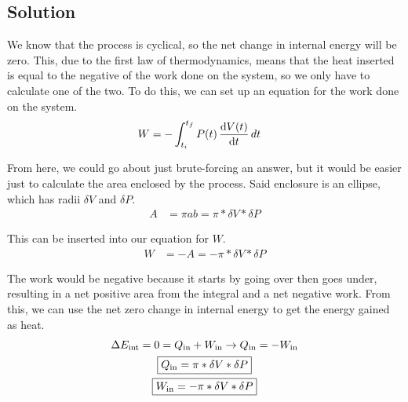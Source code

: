 \documentclass[12pt]{article}
\begin{document}
        \subsection{Solution}
            We know that the process is cyclical, so the net change in internal energy will be zero. 
            This, due to the first law of thermodynamics, means that the heat inserted is equal to the negative of the work done on the system, so we only have to calculate one of the two.
            To do this, we can set up an equation for the work done on the system.
            \begin{align}
                W   &=  -\int_{t_i}^{t_f} P(t)\,\dv{V(t)}{t}\,dt
            \end{align}

            From here, we could go about just brute-forcing an answer, but it would be easier just to calculate the area enclosed by the process.
            Said enclosure is an ellipse, which has radii $\delta V$ and $\delta P$. 
            \begin{align}
                A   &=  \pi ab
                    =   \pi * \delta V * \delta P
            \end{align}

            This can be inserted into our equation for $W$.
            \begin{align}
                W   &=  -A
                    =   -\pi * \delta V * \delta P
            \end{align}

            The work would be negative because it starts by going over then goes under, resulting in a net positive area from the integral and a net negative work.
            From this, we can use the net zero change in internal energy to get the energy gained as heat.
            \begin{gather}
                \Delta E_{\rm int} = 0 = Q_{\rm in} + W_{\rm in} \to Q_{\rm in} = -W_{\rm in}\\
                \boxed{Q_{\rm in} = \pi * \delta V * \delta P}\\
                \boxed{W_{\rm in} = -\pi * \delta V * \delta P}
            \end{gather}

\end{document}
